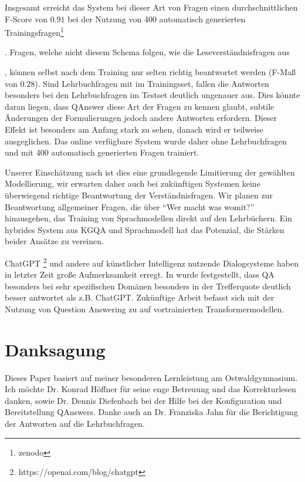 \documentclass[utf8,biblatex]{lni}
\begin{document}
Insgesamt erreicht das System bei dieser Art von Fragen einen durchschnittlichen F-Score von $0.91$ bei der Nutzung von 400 automatisch generierten Trainingsfragen\footnote{zenodo}\addtocounter{footnote}{-1}\addtocounter{Hfootnote}{-1}.
Fragen, welche nicht diesem Schema folgen, wie die Leseverständnisfragen aus \cite{bb}\footnotemark{}\addtocounter{footnote}{-1}\addtocounter{Hfootnote}{-1}, können selbst nach dem Training nur selten richtig beantwortet werden (F-Maß von $0.28$)\footnotemark{}.
Sind Lehrbuchfragen mit im Trainingsset, fallen die Antworten besonders bei den Lehrbuchfragen im Testset deutlich ungenauer aus.
Dies könnte daran liegen, dass QAnswer diese Art der Fragen zu kennen glaubt, subtile Änderungen der Formulierungen jedoch andere Antworten erfordern.
Dieser Effekt ist besonders am Anfang stark zu sehen, danach wird er teilweise ausgeglichen.
Das online verfügbare System wurde daher ohne Lehrbuchfragen und mit 400 automatisch generierten Fragen trainiert.

Unserer Einschätzung nach ist dies eine grundlegende Limitierung der gewählten Modellierung, wir erwarten daher auch bei zukünftigen Systemen keine überwiegend richtige Beantwortung der Verständnisfragen.
Wir planen zur Beantwortung allgemeiner Fragen, die über \enquote{Wer macht was womit?} hinausgehen, das Training von Sprachmodellen direkt auf den Lehrbüchern.
Ein hybrides System aus KGQA und Sprachmodell hat das Potenzial, die Stärken beider Ansätze zu vereinen.

ChatGPT \footnote{https://openai.com/blog/chatgpt} und andere auf künstlicher Intelligenz nutzende Dialogsysteme haben in letzter Zeit große Aufmerksamkeit erregt.
In \cite{gptvsqa} wurde festgestellt, dass QA besonders bei sehr spezifischen Domänen besonders in der Trefferquote deutlich besser antwortet als z.B. ChatGPT.
Zukünftige Arbeit befasst sich mit der Nutzung von Question Answering zu \cite{bb} auf vortrainierten Transformermodellen.

\section{Danksagung}

Dieses Paper basiert auf meiner besonderen Lernleistung am Ostwaldgymnasium.
Ich möchte Dr. Konrad Höffner für seine enge Betreuung und das Korrekturlesen danken, sowie Dr. Dennis Diefenbach bei der Hilfe bei der Konfiguration und Bereitstellung QAnswers.
Danke auch an Dr. Franziska Jahn für die Berichtigung der Antworten auf die Lehrbuchfragen. 

\printbibliography
\end{document}
